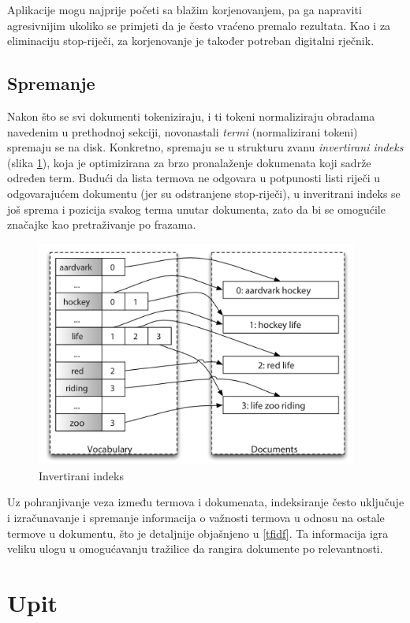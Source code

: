 \documentclass[a4paper,twoside,12pt]{scrreprt}
\begin{document}
Aplikacije mogu najprije početi sa blažim korjenovanjem, pa ga napraviti agresivnijim ukoliko se primjeti da je često vraćeno premalo rezultata. Kao i za eliminaciju stop-riječi, za korjenovanje je također potreban digitalni rječnik.

\subsection{Spremanje}

Nakon što se svi dokumenti tokeniziraju, i ti tokeni normaliziraju obradama navedenim u prethodnoj sekciji, novonastali \textit{termi} (normalizirani tokeni) spremaju se na disk. Konkretno, spremaju se u strukturu zvanu \textit{invertirani indeks} (slika \ref{inverted_index}), koja je optimizirana za brzo pronalaženje dokumenata koji sadrže određen term. Budući da lista termova ne odgovara u potpunosti listi riječi u odgovarajućem dokumentu (jer su odstranjene stop-riječi), u inveritrani indeks se još sprema i pozicija svakog terma unutar dokumenta, zato da bi se omogućile značajke kao pretraživanje po frazama.

\begin{figure}[H]
  \centering
  \includegraphics[width=300pt]{inverted_index}
  \caption{Invertirani indeks}
  \label{inverted_index}
\end{figure}

Uz pohranjivanje veza između termova i dokumenata, indeksiranje često uključuje i izračunavanje i spremanje informacija o važnosti termova u odnosu na ostale termove u dokumentu, što je detaljnije objašnjeno u \ref{tfidf}. Ta informacija igra veliku ulogu u omogućavanju tražilice da rangira dokumente po relevantnosti.

\section{Upit}
\end{document}

